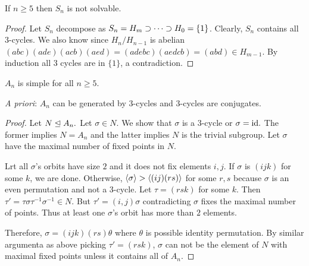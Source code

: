     \begin{theorem}
        If $n \geq 5$ then $S_n$ is not solvable.
    \end{theorem}

    \begin{proof}
        Let $S_n$ decompose as $S_n = H_m \supset \cdots \supset H_0 = \{1\}$. Clearly, $S_n$ contains all $3$-cycles. We also know since $H_n/H_{n-1}$ is abelian $(abc)(ade)(acb)(aed) = (adebc)(aedcb) = (abd) \in H_{m-1}$. By induction all 3 cycles are in $\{1\}$, a contradiction.
    \end{proof}

    \begin{theorem}
        $A_n$ is simple for all $n \geq 5$.
    \end{theorem}
    \noindent \textit{A priori}: $A_n$ can be generated by $3$-cycles and $3$-cycles are conjugates.
    \begin{proof}
        Let $N \trianglelefteq A_n.$ Let $\sigma \in N$. We show that $\sigma$ is a $3$-cycle or $\sigma = \text{id}.$ The former implies $N = A_n$ and the latter implies $N$ is the trivial subgroup.  Let $\sigma$ have the maximal number of fixed points in $N$.

      Lrt all $\sigma$'s orbits have size $2$ and it does not fix elements $i, j$. If $\sigma$ is $(ijk)$ for some $k$, we are done. Otherwise,  $\langle \sigma \rangle > \langle (ij)(rs) \rangle$ for some $r, s$ because $\sigma$ is an even permutation and not a $3$-cycle. Let $\tau = (rsk)$ for some $k$. Then $\tau' = \tau \sigma \tau^{-1} \sigma^{-1}  \in N$. But $\tau' = (i, j)\sigma$ contradicting $\sigma$ fixes the maximal number of points. Thus at least one $\sigma$'s orbit has more than $2$ elements.

    Therefore, $\sigma = (ijk)(rs) \theta$ where $\theta$ is possible identity permutation. By similar argumenta as above picking $\tau' = (rsk)$, $\sigma$ can not be the element of $N$ with maximal fixed points unless it contains all of $A_n$.  
    \end{proof} 

